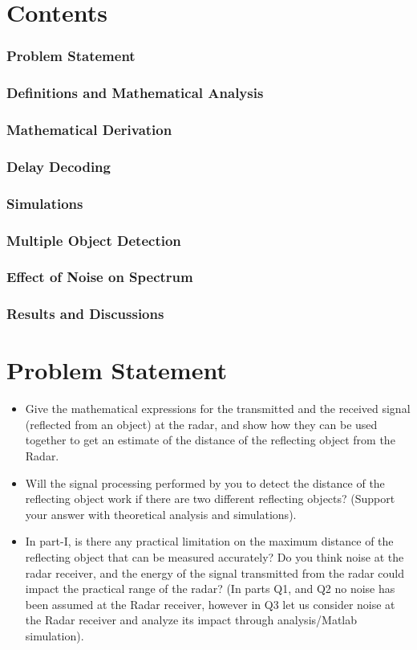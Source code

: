 \documentclass[12pt]{article}
\begin{document}
\section*{Contents}
\subsubsection*{Problem Statement}
\subsubsection*{Definitions and Mathematical Analysis}
\subsubsection*{Mathematical Derivation}
\subsubsection*{Delay Decoding}
\subsubsection*{Simulations}
\subsubsection*{Multiple Object Detection}
\subsubsection*{Effect of Noise on Spectrum}
\subsubsection*{Results and Discussions}
\pagebreak
\section{Problem Statement}
\begin{flushleft}
\begin{itemize}
    \item Give the mathematical expressions for the transmitted and the received signal (reflected from an object) at the radar, and show how  they can be used together to get an estimate of the distance of the reflecting object from the Radar. 
    \item Will the signal processing performed by you to detect the distance of the reflecting object work if there are two different reflecting objects? (Support your answer with theoretical analysis and simulations).
    \item In part-I, is there any practical limitation on the maximum distance of the reflecting object that can be measured accurately? Do you think noise at the radar receiver, and the energy of the signal transmitted from the radar could impact the practical range of the radar? (In parts Q1, and Q2 no noise has been assumed at the Radar receiver, however in Q3 let us consider noise at the Radar receiver and analyze its impact through analysis/Matlab simulation).
\end{itemize}
\end{flushleft}
\end{document}
